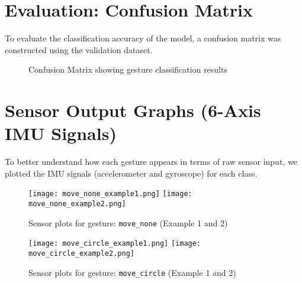 \documentclass[a4paper,12pt]{article}
\begin{document}
\section{Evaluation: Confusion Matrix}
To evaluate the classification accuracy of the model, a confusion matrix was constructed using the validation dataset.

\begin{figure}[h!]
\centering
{}
\caption{Confusion Matrix showing gesture classification results}
\label{fig:confusion_matrix}
\end{figure}

\section{Sensor Output Graphs (6-Axis IMU Signals)}
To better understand how each gesture appears in terms of raw sensor input, we plotted the IMU signals (accelerometer and gyroscope) for each class.

\begin{figure}[H]
\centering
\texttt{[image: move\_none\_example1.png]}
\hfill
\texttt{[image: move\_none\_example2.png]}
\caption{Sensor plots for gesture: \texttt{move\_none} (Example 1 and 2)}
\end{figure}

\begin{figure}[H]
\centering
\texttt{[image: move\_circle\_example1.png]}
\hfill
\texttt{[image: move\_circle\_example2.png]}
\caption{Sensor plots for gesture: \texttt{move\_circle} (Example 1 and 2)}
\end{figure}
\end{document}
